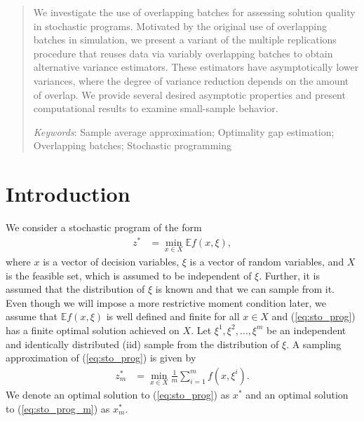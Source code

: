 \documentclass[11pt]{article}
\newcommand{\e}[1]{\mathbb{E} %
#1 %
}
\newcommand{\x}{x} %
\newcommand{\xs}{\x^*}
\newcommand{\xit}{\xi}  %
\newcommand{\xiti}{\xit^i}
\newcommand{\Keywords}[1]{\par\noindent 
{\small{\em Keywords\/}: #1}}
\begin{document}
\begin{abstract}
We investigate the use of overlapping batches for assessing solution quality in stochastic programs. 
Motivated by the original use of overlapping batches in simulation, we present a variant of the multiple replications procedure that reuses data via variably overlapping batches to obtain alternative variance estimators.  
These estimators have asymptotically lower variances, where the degree of variance reduction depends on the amount of overlap.  
We provide several desired asymptotic properties and present computational results to examine small-sample behavior.\smallskip 
	
	\Keywords{Sample average approximation; Optimality gap estimation; Overlapping batches; Stochastic programming}
\end{abstract}

\section{Introduction}
\label{sec:intro}

We consider a stochastic program of the form
\begin{align} \tag{SP} \label{eq:sto_prog} 
	z^* & = \min_{\x \in X} \e{f(\x,\xit)},
\end{align}
where $\x$ is a vector of decision variables, $\xit$ is a vector of random variables, and $X$ is the feasible set, which is assumed to be independent of $\xit$.  
Further, it is assumed that the distribution of $\xit$ is known and that we can sample from it.  
Even though we will impose a more restrictive moment condition later, we assume that $\e{f(\x,\xit)}$ is well defined and finite for all $\x \in X$ and (\ref{eq:sto_prog}) has a finite optimal solution achieved on $X$.  
Let $\xit^1, \xit^2, \dots, \xit^m$ be an independent and identically distributed (iid) sample from the distribution of $\xit$.  
A sampling approximation of (\ref{eq:sto_prog}) is given by
\begin{align} \tag{SP$_m$} \label{eq:sto_prog_m}
	z_m^* & = \min_{\x \in X} \frac{1}{m} \sum_{i=1}^m f(\x,\xiti).
\end{align}
We denote an optimal solution to (\ref{eq:sto_prog}) as $\xs$ and an optimal solution to (\ref{eq:sto_prog_m}) as $\xs_m$.
\end{document}
